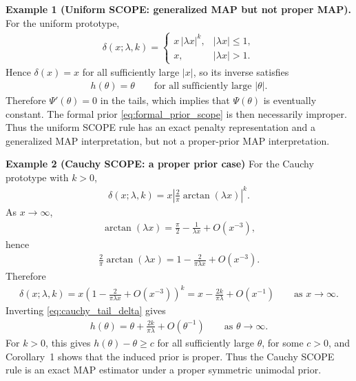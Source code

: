 \documentclass[11pt]{article}
\numberwithin{equation}{section}
\begin{document}
\medskip
\noindent
\textbf{Example 1 (Uniform SCOPE: generalized MAP but not proper MAP).}
For the uniform prototype,
\begin{eqnarray}
\delta(x;\lambda,k)
=
\left\{
\begin{array}{ll}
x\,|\lambda x|^k, & |\lambda x| \le 1, \\[1ex]
x, & |\lambda x| > 1 .
\end{array}
\right.
\label{eq:uniform_scope_here}
\end{eqnarray}
Hence $\delta(x)=x$ for all sufficiently large $|x|$, so its inverse satisfies
\begin{eqnarray}
h(\theta)=\theta
\qquad \mbox{for all sufficiently large } |\theta|.
\end{eqnarray}
Therefore $\Psi'(\theta)=0$ in the tails, which implies that $\Psi(\theta)$ is eventually constant. The formal prior \eqref{eq:formal_prior_scope} is then necessarily improper. Thus the uniform SCOPE rule has an exact penalty representation and a generalized MAP interpretation, but not a proper-prior MAP interpretation.

\medskip
\noindent\textbf{Example 2 (Cauchy SCOPE: a proper prior case)}
For the Cauchy prototype with $k>0$,
\begin{eqnarray}
\delta(x;\lambda,k)
=
x\left|\frac{2}{\pi}\arctan(\lambda x)\right|^k .
\label{eq:cauchy_scope_here}
\end{eqnarray}
As $x \to \infty$,
\begin{eqnarray}
\arctan(\lambda x)
=
\frac{\pi}{2} - \frac{1}{\lambda x} + O(x^{-3}),
\end{eqnarray}
hence
\begin{eqnarray}
\frac{2}{\pi}\arctan(\lambda x)
=
1 - \frac{2}{\pi \lambda x} + O(x^{-3}).
\end{eqnarray}
Therefore
\begin{eqnarray}
\delta(x;\lambda,k)
=
x\left(1 - \frac{2}{\pi \lambda x} + O(x^{-3})\right)^k
=
x - \frac{2k}{\pi\lambda} + O(x^{-1})
\qquad \mbox{as } x \to \infty .
\label{eq:cauchy_tail_delta}
\end{eqnarray}
Inverting \eqref{eq:cauchy_tail_delta} gives
\begin{eqnarray}
h(\theta)
=
\theta + \frac{2k}{\pi\lambda} + O(\theta^{-1})
\qquad \mbox{as } \theta \to \infty .
\end{eqnarray}
For $k>0$, this gives $h(\theta)-\theta \ge c$ for all sufficiently large $\theta$, for some $c>0$, and Corollary~1 shows that the induced prior is proper. Thus the Cauchy SCOPE rule is an exact MAP estimator under a proper symmetric unimodal prior.
\end{document}
